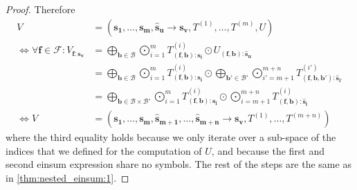 \begin{proof}
    Therefore
    \begin{align*}
        V                                                         & = (\bm{s_1},\dots,\bm{s_m}, \bm{\hat{s}_u} \rightarrow \bm{s_v}, T^{(1)},\dots,T^{(m)}, U)                                                                                                                                                                \\
        \iff \forall \bm{f} \in \mathcal{F}: V_{\bm{f}: \bm{s_v}} & = \bigoplus\limits_{\bm{b} \in \mathcal{B}} \bigodot\limits_{i = 1}^{m} T^{(i)}_{(\bm{f}, \bm{b}):\bm{s_i}} \odot U_{(\bm{f}, \bm{b}):\bm{\hat{s}_u}}                                                                                                     \\
                                                                  & = \bigoplus\limits_{\bm{b} \in \mathcal{B}} \bigodot\limits_{i = 1}^{m} T^{(i)}_{(\bm{f}, \bm{b}):\bm{s_i}} \odot \bigoplus\limits_{\bm{b'} \in \mathcal{B}'} \bigodot\limits_{i' = m + 1}^{m + n} T^{(i')}_{(\bm{f}, \bm{b}, \bm{b'}):\bm{\hat{s}_{i'}}} \\
                                                                  & = \bigoplus\limits_{\bm{b} \in \mathcal{B} \times \mathcal{B}'} \bigodot\limits_{i = 1}^{m} T^{(i)}_{(\bm{f}, \bm{b}):\bm{s_i}} \odot \bigodot\limits_{i = m + 1}^{m + n} T^{(i)}_{(\bm{f}, \bm{b}):\bm{\hat{s}_i}}                                       \\
        \iff V                                                    & = (\bm{s_1}, \dots, \bm{s_m}, \bm{\hat{s}_{m + 1}}, \dots, \bm{\hat{s}_{m + n}} \rightarrow \bm{s_v}, T^{(1)}, \dots, T^{(m + n)})
    \end{align*}
    where the third equality holds because we only iterate over a sub-space of the indices that we defined for the computation of $U$,
    and because the first and second einsum expression share no symbols.
    The rest of the steps are the same as in \autoref{thm:nested_einsum:1}.
\end{proof}